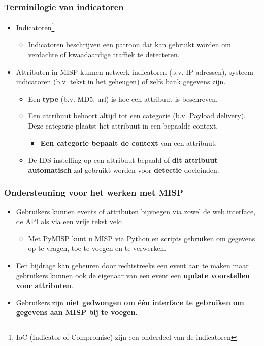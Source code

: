 \begin{frame}
        \frametitle{Terminilogie van indicatoren}
        \begin{itemize}
                \item Indicatoren\footnote{IoC (Indicator of Compromise) zijn een onderdeel van de indicatoren}
                        \begin{itemize}
                                \item Indicatoren beschrijven een patroon dat kan gebruikt worden om verdachte of kwaadaardige traffiek te detecteren.
                        \end{itemize}
                \item Attributen in MISP kunnen netwerk indicatoren (b.v. IP adressen), systeem indicatoren (b.v. tekst in het geheugen) of zelfs bank gegevens zijn.
                \begin{itemize}
                        \item Een {\bf type} (b.v. MD5, url) is hoe een attribuut is beschreven.
                \end{itemize}
                \begin{itemize}
                \item Een attribuut behoort altijd tot een categorie (b.v. Payload delivery). Deze categorie plaatst het attribuut in een bepaalde context.
                        \begin{itemize}
                                \item {\bf Een categorie bepaalt de context } van een attribuut.
                        \end{itemize}
                \item De IDS instelling op een attribuut bepaald of {\bf dit attribuut automatisch} zal gebruikt worden voor {\bf detectie} doeleinden.
                \end{itemize}
        \end{itemize}
\end{frame}

\begin{frame}
        \frametitle{Ondersteuning voor het werken met MISP}
        \begin{itemize}
            \item Gebruikers kunnen events of attributen bijvoegen via zowel de web interface, de API als via een vrije tekst veld.
                \begin{itemize}
                        \item Met PyMISP kunt u MISP via Python en scripts gebruiken om gegevens op te vragen, toe te voegen en te verwerken.
                \end{itemize}
        \item Een bijdrage kan gebeuren door rechtstreeks een event aan te maken maar gebruikers kunnen ook de eigenaar van een event een {\bf update voorstellen voor attributen}.
            \item Gebruikers zijn {\bf niet gedwongen om één interface te gebruiken om gegevens aan MISP bij te voegen}.
        \end{itemize}
\end{frame}

